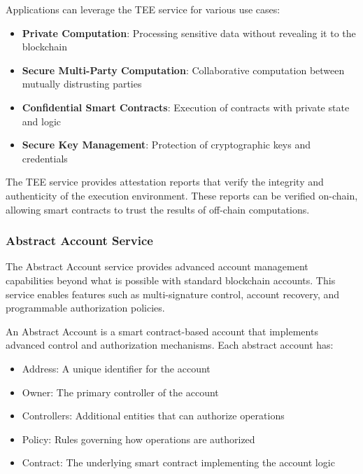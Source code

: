 Applications can leverage the TEE service for various use cases:

\begin{itemize}
    \item \textbf{Private Computation}: Processing sensitive data without revealing it to the blockchain
    \item \textbf{Secure Multi-Party Computation}: Collaborative computation between mutually distrusting parties
    \item \textbf{Confidential Smart Contracts}: Execution of contracts with private state and logic
    \item \textbf{Secure Key Management}: Protection of cryptographic keys and credentials
\end{itemize}

The TEE service provides attestation reports that verify the integrity and authenticity of the execution environment. These reports can be verified on-chain, allowing smart contracts to trust the results of off-chain computations.

\subsubsection{Abstract Account Service}
\label{subsubsec:abstract-account}

The Abstract Account service provides advanced account management capabilities beyond what is possible with standard blockchain accounts. This service enables features such as multi-signature control, account recovery, and programmable authorization policies.



\begin{definition}
An Abstract Account is a smart contract-based account that implements advanced control and authorization mechanisms. Each abstract account has:
\begin{itemize}
    \item Address: A unique identifier for the account
    \item Owner: The primary controller of the account
    \item Controllers: Additional entities that can authorize operations
    \item Policy: Rules governing how operations are authorized
    \item Contract: The underlying smart contract implementing the account logic
\end{itemize}
\end{definition}

